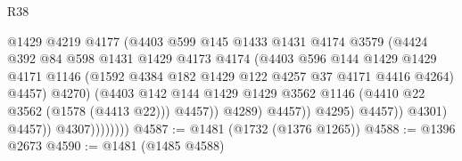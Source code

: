 \begin{lexlean}{R38}
\begin{coremodule}
                                      @1429
                                      @4219
                                      @4177
                                      (@4403
                                        @599
                                        @145
                                        @1433
                                        @1431
                                        @4174
                                        @3579
                                        (@4424
                                          @392
                                          @84
                                          @598
                                          @1431
                                          @1429
                                          @4173
                                          @4174
                                          (@4403
                                            @596
                                            @144
                                            @1429
                                            @1429
                                            @4171
                                            @1146
                                            (@1592
                                              @4384
                                              @182
                                              @1429
                                              @122
                                              @4257
                                              @37
                                              @4171
                                              @4416
                                              @4264)
                                            @4457)
                                          @4270)
                                        (@4403
                                          @142
                                          @144
                                          @1429
                                          @1429
                                          @3562
                                          @1146
                                          (@4410 @22 @3562 (@1578 (@4413 @22)))
                                          @4457))
                                      @4289)
                                    @4457))
                                @4295)
                              @4457))
                          @4301)
                        @4457))
                    @4307))))))))
@4587 := @1481 (@1732 (@1376 @1265))
@4588 := @1396 @2673
@4590 := @1481 (@1485 @4588)

\end{coremodule}
\end{lexlean}
